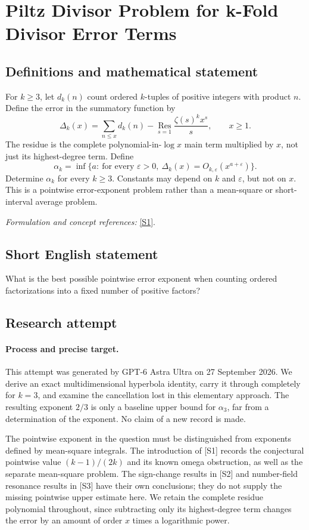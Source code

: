 \documentclass[11pt]{article}
\begin{document}
\section*{\texorpdfstring{Piltz Divisor Problem for k-Fold Divisor Error Terms}{Piltz Divisor Problem for k-Fold Divisor Error Terms}}\label{30006934}
\subsection{Definitions and mathematical statement}
For $k\ge3$, let $d_k(n)$ count ordered $k$-tuples of positive integers with product $n$. Define the error in the summatory function by
\[
 \Delta_k(x)=\sum_{n\le x}d_k(n)
 -\operatorname*{Res}_{s=1}\frac{\zeta(s)^k x^s}{s},\qquad x\ge1.
\]
The residue is the complete polynomial-in-$\log x$ main term multiplied by $x$, not just its highest-degree term. Define
\[
 \alpha_k=\inf\{a:\ \text{for every }{\varepsilon}>0,
 \ \Delta_k(x)=O_{k,{\varepsilon}}(x^{a+{\varepsilon}})\}.
\]
Determine $\alpha_k$ for every $k\ge3$. Constants may depend on $k$ and ${\varepsilon}$, but not on $x$. This is a pointwise error-exponent problem rather than a mean-square or short-interval average problem.
\par\smallskip\textit{Formulation and concept references:} \href{https://arxiv.org/html/2303.05028}{[S1]}.

\subsection{Short English statement}
What is the best possible pointwise error exponent when counting ordered factorizations into a fixed number of positive factors?
\subsection{Research attempt}
\paragraph{Process and precise target.}
This attempt was generated by GPT-6 Astra Ultra on 27 September 2026. We derive an exact multidimensional hyperbola identity, carry it through completely for $k=3$, and examine the cancellation lost in this elementary approach. The resulting exponent $2/3$ is only a baseline upper bound for $\alpha_3$, far from a determination of the exponent. No claim of a new record is made.

The pointwise exponent in the question must be distinguished from exponents defined by mean-square integrals. The introduction of [S1] records the conjectural pointwise value $(k-1)/(2k)$ and its known omega obstruction, as well as the separate mean-square problem. The sign-change results in [S2] and number-field resonance results in [S3] have their own conclusions; they do not supply the missing pointwise upper estimate here. We retain the complete residue polynomial throughout, since subtracting only its highest-degree term changes the error by an amount of order $x$ times a logarithmic power.
\end{document}
